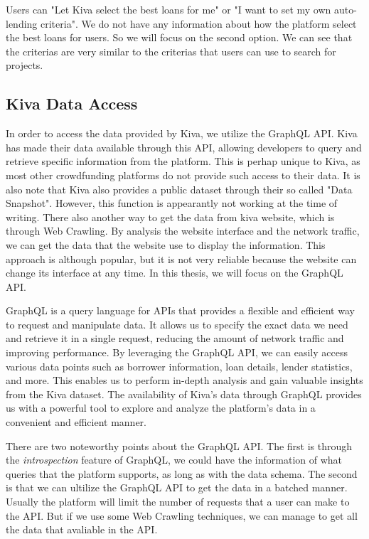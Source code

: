 Users can "Let Kiva select the best loans for me" or "I want to set my own auto-lending criteria".
We do not have any information about how the platform select the best loans for users.
So we will focus on the second option.
We can see that the criterias are very similar to the criterias that users can use to search for projects.

\subsection{Kiva Data Access}

In order to access the data provided by Kiva, we utilize the GraphQL API.
Kiva has made their data available through this API, allowing developers to query and retrieve specific information from the platform.
This is perhap unique to Kiva, as most other crowdfunding platforms do not provide such access to their data.
It is also note that Kiva also provides a public dataset through their so called "Data Snapshot".
However, this function is appearantly not working at the time of writing.
There also another way to get the data from kiva website, which is through Web Crawling.
By analysis the website interface and the network traffic, we can get the data that the website use to display the information.
This approach is although popular, but it is not very reliable because the website can change its interface at any time.
In this thesis, we will focus on the GraphQL API.

GraphQL is a query language for APIs that provides a flexible and efficient way to request and manipulate data.
It allows us to specify the exact data we need and retrieve it in a single request, reducing the amount of network traffic and improving performance.
By leveraging the GraphQL API, we can easily access various data points such as borrower information, loan details, lender statistics, and more.
This enables us to perform in-depth analysis and gain valuable insights from the Kiva dataset.
The availability of Kiva's data through GraphQL provides us with a powerful tool to explore and analyze the platform's data in a convenient and efficient manner.

There are two noteworthy points about the GraphQL API.
The first is through the \textit{introspection} \cite{graphql-introspection} feature of GraphQL,
we could have the information of what queries that the platform supports,
as long as with the data schema.
The second is that we can ultilize the GraphQL API to get the data in a batched manner.
Usually the platform will limit the number of requests that a user can make to the API.
But if we use some Web Crawling techniques, we can manage to get all the data that avaliable in the API.

